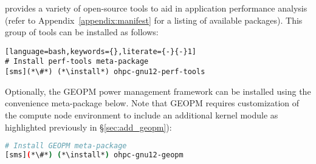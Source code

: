 \OHPC{} provides a variety of open-source tools to aid in application
performance analysis (refer to Appendix~\ref{appendix:manifest} for a listing
of available packages). This group of tools can be installed as follows:

\begin{lstlisting}[language=bash,keywords={},literate={-}{-}1]
# Install perf-tools meta-package
[sms](*\#*) (*\install*) ohpc-gnu12-perf-tools
\end{lstlisting}

\noindent Optionally, the GEOPM power management framework can be installed
using the convenience meta-package below. Note that GEOPM
requires customization of the compute node environment to include an additional
kernel module as highlighted previously in \S\ref{sec:add_geopm}):

\begin{lstlisting}[language=bash,keywords={},upquote=true]
# Install GEOPM meta-package
[sms](*\#*) (*\install*) ohpc-gnu12-geopm

\end{lstlisting}
